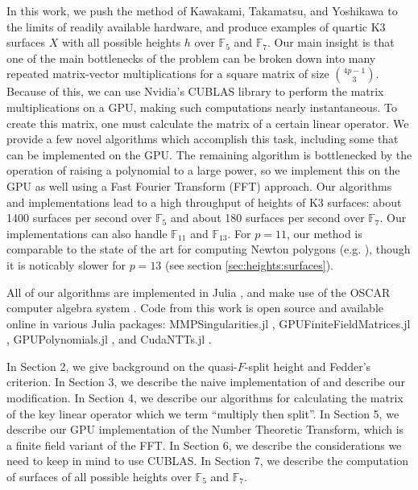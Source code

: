 \documentclass[a4paper]{article}
\theoremstyle{definition}
\theoremstyle{remark}
\begin{document}
In this work, we push the method of Kawakami,
Takamatsu, and Yoshikawa to the limits of readily
available hardware, 
and produce examples of quartic K3 surfaces \(X\) with all
possible heights \(h\) 
over \(\mathbb{F}_{5}\) and \(\mathbb{F}_{7}\).
Our main insight is that one of the main
bottlenecks of the problem can be broken down 
into many repeated matrix-vector
multiplications for a square matrix of size 
\(\binom{4p-1}{3}\).
Because of this, we can use Nvidia's CUBLAS library 
\cite{nvidia-2024-cublas}
to perform the matrix multiplications
on a GPU, making such computations
nearly instantaneous.
To create this matrix, one must calculate the matrix of a
certain linear operator.
We provide a few novel algorithms which accomplish this task,
including some that can be implemented on the GPU.
The remaining algorithm is bottlenecked by the operation
of raising a polynomial to a large power, 
so we implement this on the GPU as well using 
a Fast Fourier Transform (FFT) approach.
Our algorithms and implementations lead to a high throughput
of heights of K3 surfaces: 
about 1400 surfaces per second over \(\mathbb{F}_{5}\) and
about 180 surfaces per second over \(\mathbb{F}_{7}\).
Our implementations can also handle \(\mathbb{F}_{11}\) 
and \(\mathbb{F}_{13}\). 
For \(p = 11\), our method is comparable to the state of the art
for computing Newton polygons (e.g. 
\cite{chk-2019-toric-controlled-reduction}),
though it is noticably slower 
for \(p = 13\) (see section \ref{sec:heights:surfaces}).

All of our algorithms are implemented in Julia 
\cite{julia-2017}, and
make use of the OSCAR computer algebra system 
\cite{OSCAR-book}.
Code from this work is open source and available online 
in various
Julia packages: 
MMPSingularities.jl \cite{mmpsingularities-jl},
GPUFiniteFieldMatrices.jl \cite{gpuffmatrices-jl}, 
GPUPolynomials.jl \cite{gpupolynomials-jl},
and CudaNTTs.jl \cite{cudantts-jl}.

In Section 2, we give background on the quasi-\(F\)-split height
and Fedder's criterion.
In Section 3, we describe the naive implementation of
\cite[Theorem~C]{kty-2022-fedder} and describe
our modification.
In Section 4, we describe our algorithms for calculating the matrix
of the key linear operator which we term ``multiply then split''.
In Section 5, we describe our GPU implementation of the Number Theoretic
Transform, which is a finite field variant of the FFT.
In Section 6, we describe the considerations we need to keep in mind
to use CUBLAS.
In Section 7, we describe the computation of surfaces of all possible
heights over \(\mathbb{F}_{5}\) and \(\mathbb{F}_{7}\).
\end{document}
